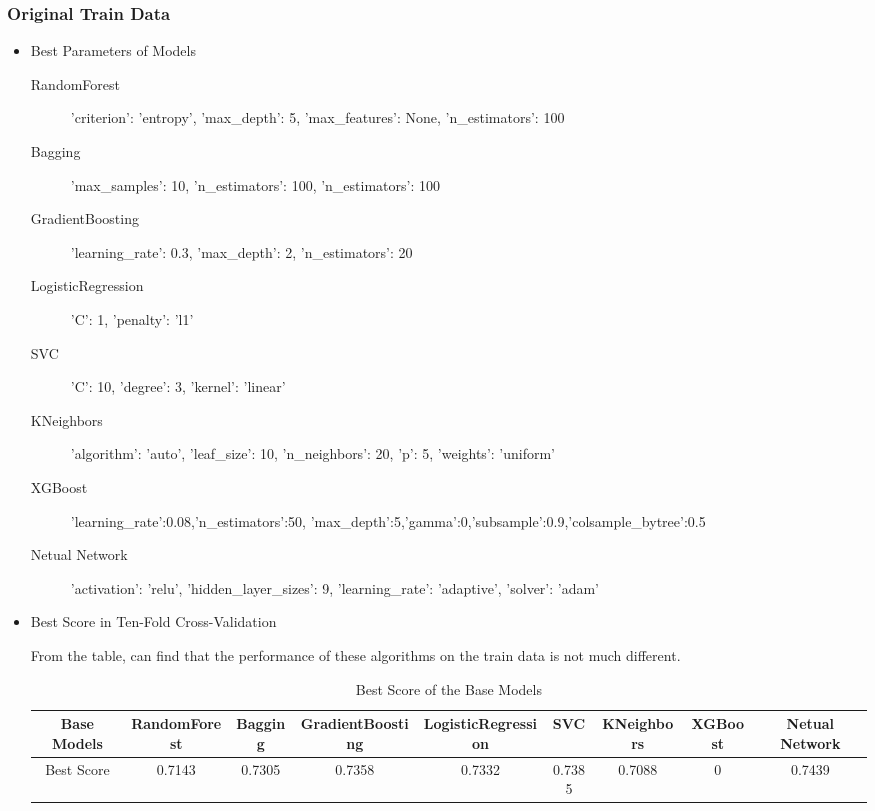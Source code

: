 \subsubsection{Original Train Data}

\begin{itemize}
	\item Best Parameters of Models
	\begin{description}
		\item[RandomForest] 'criterion': 'entropy', 'max_depth': 5, 
		'max_features': None, 'n_estimators': 100
		\item[Bagging] 'max_samples': 10, 'n_estimators': 100,
		'n_estimators': 100
		\item[GradientBoosting] 'learning_rate': 0.3, 'max_depth': 2, 
		'n_estimators': 20
		\item[LogisticRegression] 'C': 1, 'penalty': 'l1'
		\item[SVC] 'C': 10, 'degree': 3, 'kernel': 'linear'
		\item[KNeighbors] 'algorithm': 'auto', 'leaf_size': 10, 
		'n_neighbors': 20, 'p': 5, 'weights': 'uniform'
		\item[XGBoost] 'learning_rate':0.08,'n_estimators':50,
		'max_depth':5,'gamma':0,'subsample':0.9,'colsample_bytree':0.5
		\item[Netual Network] 'activation': 'relu', 'hidden_layer_sizes': 9, 'learning_rate': 'adaptive', 
		'solver': 'adam'
	\end{description}
	
	\item Best Score in Ten-Fold Cross-Validation
	
	From the table, 
	can find that the performance of 
	these algorithms on the train data 
	is not much different.
	
	\begin{table}[h]  \centering
		\caption{Best Score of the Base Models}
		\label{tbl:best_score_base_models_old}
		\begin{tabular}{ccccccccc}
			\hline
			Base Models& RandomForest & Bagging & GradientBoosting & 
			LogisticRegression & SVC & KNeighbors & XGBoost & Netual Network\\
			\hline
			Best Score & 0.7143 & 0.7305 & 0.7358 & 
			0.7332 & 0.7385 & 0.7088 & 0 & 0.7439\\
			\hline 
		\end{tabular}
	\end{table}
\end{itemize}

